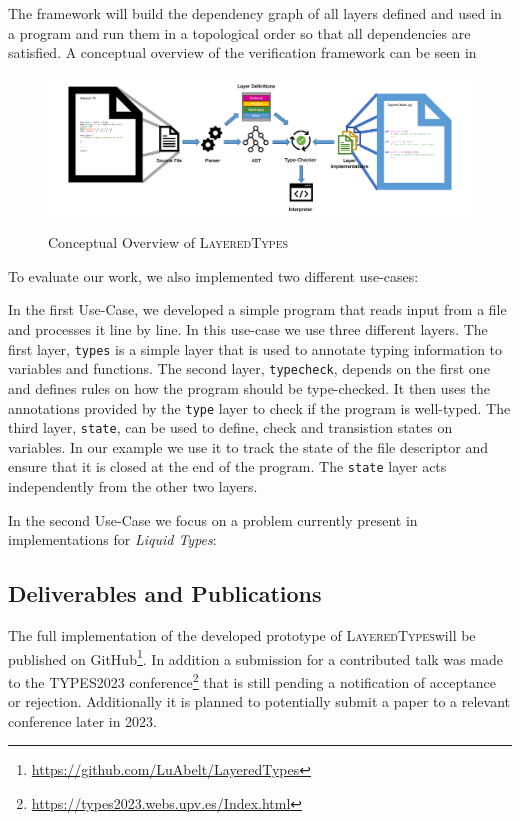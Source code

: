 \documentclass{easychair}
\newcommand{\LayeredTypes}{\textsc{LayeredTypes}}
\begin{document}
The framework will build the dependency graph of all layers defined and used in a program and run them in a topological order so that all dependencies are satisfied. A conceptual overview of the verification framework can be seen in 

\begin{figure}[ht!]
	\centering
	\includegraphics[width=.8\textwidth]{framework_overview}
	\label{fig:framework_overview}
	\caption{Conceptual Overview of \LayeredTypes}
\end{figure}

To evaluate our work, we also implemented two different use-cases:

In the first Use-Case, we developed a simple program that reads input from a file and processes it line by line. In this use-case we use three different layers. The first layer, \texttt{types} is a simple layer that is used to annotate typing information to variables and functions. The second layer, \texttt{typecheck}, depends on the first one and defines rules on how the program should be type-checked. It then uses the annotations provided by the \texttt{type} layer to check if the program is well-typed. The third layer, \texttt{state}, can be used to define, check and transistion states on variables. In our example we use it to track the state of the file descriptor and ensure that it is closed at the end of the program. The \texttt{state} layer acts independently from the other two layers.

In the second Use-Case we focus on a problem currently present in implementations for \textit{Liquid Types}:

\subsection{Deliverables and Publications}

The full implementation of the developed prototype of \LayeredTypes will be published on GitHub\footnote{\url{https://github.com/LuAbelt/LayeredTypes}}. In addition a submission for a contributed talk was made to the TYPES2023 conference\footnote{\url{https://types2023.webs.upv.es/Index.html}} that is still pending a notification of acceptance or rejection. Additionally it is planned to potentially submit a paper to a relevant conference later in 2023.
\end{document}
